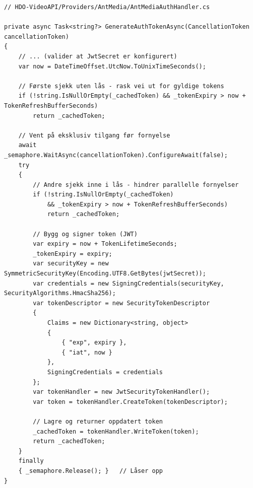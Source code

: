 \begin{lstlisting}[language={[Sharp]C}, label=lst:antmedia-auth,
  caption={Double-check locking i \texttt{AntMediaAuthHandler}.}]
// HDO-VideoAPI/Providers/AntMedia/AntMediaAuthHandler.cs

private async Task<string?> GenerateAuthTokenAsync(CancellationToken cancellationToken)
{
    // ... (valider at JwtSecret er konfigurert)
    var now = DateTimeOffset.UtcNow.ToUnixTimeSeconds();

    // Første sjekk uten lås - rask vei ut for gyldige tokens
    if (!string.IsNullOrEmpty(_cachedToken) && _tokenExpiry > now + TokenRefreshBufferSeconds)
        return _cachedToken;

    // Vent på eksklusiv tilgang før fornyelse
    await _semaphore.WaitAsync(cancellationToken).ConfigureAwait(false);
    try
    {
        // Andre sjekk inne i lås - hindrer parallelle fornyelser
        if (!string.IsNullOrEmpty(_cachedToken) 
            && _tokenExpiry > now + TokenRefreshBufferSeconds)
            return _cachedToken;

        // Bygg og signer token (JWT)
        var expiry = now + TokenLifetimeSeconds;
        _tokenExpiry = expiry;
        var securityKey = new SymmetricSecurityKey(Encoding.UTF8.GetBytes(jwtSecret));
        var credentials = new SigningCredentials(securityKey, SecurityAlgorithms.HmacSha256);
        var tokenDescriptor = new SecurityTokenDescriptor
        {
            Claims = new Dictionary<string, object>
            {
                { "exp", expiry },
                { "iat", now }
            },
            SigningCredentials = credentials
        };
        var tokenHandler = new JwtSecurityTokenHandler();
        var token = tokenHandler.CreateToken(tokenDescriptor);

        // Lagre og returner oppdatert token
        _cachedToken = tokenHandler.WriteToken(token);
        return _cachedToken;
    }
    finally 
    { _semaphore.Release(); }   // Låser opp
}
\end{lstlisting}



